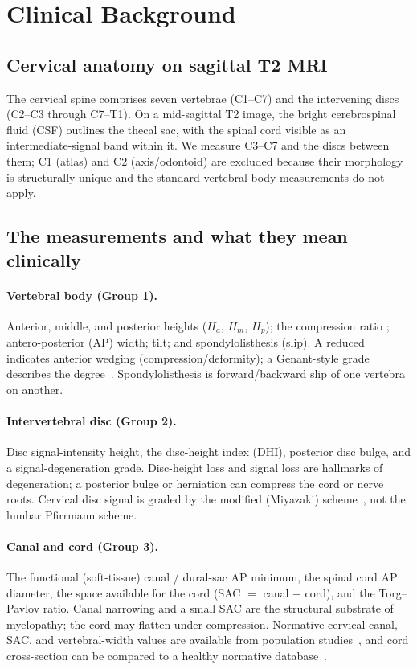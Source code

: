 \section{Clinical Background}
\label{sec:clinical}

\subsection{Cervical anatomy on sagittal T2 MRI}
The cervical spine comprises seven vertebrae (C1--C7) and the intervening discs (C2--C3 through
C7--T1). On a mid-sagittal T2 image, the bright cerebrospinal fluid (CSF) outlines the thecal sac, with
the spinal cord visible as an intermediate-signal band within it. We measure C3--C7 and the discs between
them; C1 (atlas) and C2 (axis/odontoid) are excluded because their morphology is structurally unique and
the standard vertebral-body measurements do not apply.

\subsection{The measurements and what they mean clinically}
\paragraph{Vertebral body (Group 1).} Anterior, middle, and posterior heights ($H_a$, $H_m$, $H_p$);
the compression ratio \hahp{}; antero-posterior (AP) width; tilt; and spondylolisthesis (slip). A
reduced \hahp{} indicates anterior wedging (compression/deformity); a Genant-style grade describes the
degree~\cite{genant1993}. Spondylolisthesis is forward/backward slip of one vertebra on another.

\paragraph{Intervertebral disc (Group 2).} Disc signal-intensity height, the disc-height index (DHI),
posterior disc bulge, and a signal-degeneration grade. Disc-height loss and signal loss are hallmarks of
degeneration; a posterior bulge or herniation can compress the cord or nerve roots. Cervical disc signal
is graded by the modified (Miyazaki) scheme~\cite{miyazaki2008}, not the lumbar Pfirrmann scheme.

\paragraph{Canal and cord (Group 3).} The functional (soft-tissue) canal / dural-sac AP minimum, the
spinal cord AP diameter, the space available for the cord (SAC $=$ canal $-$ cord), and the
Torg--Pavlov ratio. Canal narrowing and a small SAC are the structural substrate of myelopathy; the
cord may flatten under compression. Normative cervical canal, SAC, and vertebral-width values are
available from population studies~\cite{nell2019}, and cord cross-section can be compared to a healthy
normative database~\cite{valosek2024}.

